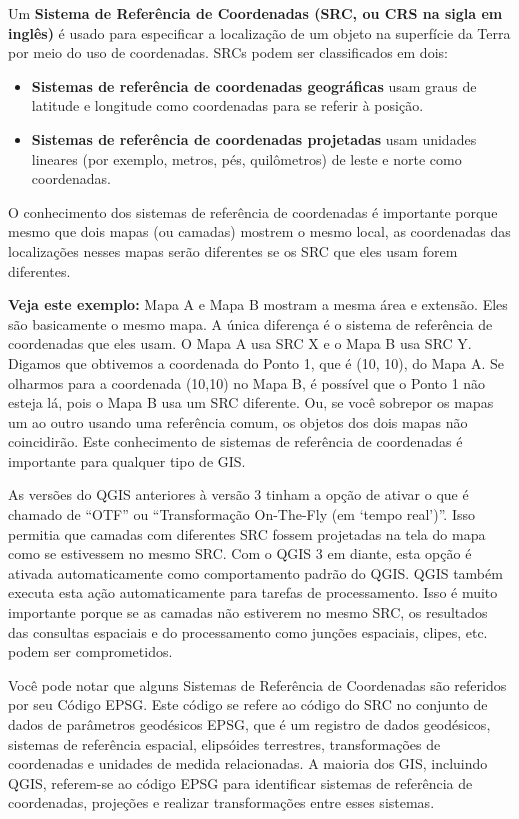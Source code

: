 \documentclass[
]{krantz}
\providecommand{\tightlist}{%
  \setlength{\itemsep}{0pt}\setlength{\parskip}{0pt}}
\begin{document}
Um \textbf{Sistema de Referência de Coordenadas (SRC, ou CRS na sigla em inglês)} é usado para especificar a localização de um objeto na superfície da Terra por meio do uso de coordenadas. SRCs podem ser classificados em dois:

\begin{itemize}
\tightlist
\item
  \textbf{Sistemas de referência de coordenadas geográficas} usam graus de latitude e longitude como coordenadas para se referir à posição.
\item
  \textbf{Sistemas de referência de coordenadas projetadas} usam unidades lineares (por exemplo, metros, pés, quilômetros) de leste e norte como coordenadas.
\end{itemize}

O conhecimento dos sistemas de referência de coordenadas é importante porque mesmo que dois mapas (ou camadas) mostrem o mesmo local, as coordenadas das localizações nesses mapas serão diferentes se os SRC que eles usam forem diferentes.

\textbf{Veja este exemplo:} Mapa A e Mapa B mostram a mesma área e extensão. Eles são basicamente o mesmo mapa. A única diferença é o sistema de referência de coordenadas que eles usam. O Mapa A usa SRC X e o Mapa B usa SRC Y. Digamos que obtivemos a coordenada do Ponto 1, que é (10, 10), do Mapa A. Se olharmos para a coordenada (10,10) no Mapa B, é possível que o Ponto 1 não esteja lá, pois o Mapa B usa um SRC diferente. Ou, se você sobrepor os mapas um ao outro usando uma referência comum, os objetos dos dois mapas não coincidirão. Este conhecimento de sistemas de referência de coordenadas é importante para qualquer tipo de GIS.

As versões do QGIS anteriores à versão 3 tinham a opção de ativar o que é chamado de ``OTF'' ou ``Transformação On-The-Fly (em `tempo real')''. Isso permitia que camadas com diferentes SRC fossem projetadas na tela do mapa como se estivessem no mesmo SRC. Com o QGIS 3 em diante, esta opção é ativada automaticamente como comportamento padrão do QGIS. QGIS também executa esta ação automaticamente para tarefas de processamento. Isso é muito importante porque se as camadas não estiverem no mesmo SRC, os resultados das consultas espaciais e do processamento como junções espaciais, clipes, etc. podem ser comprometidos.

Você pode notar que alguns Sistemas de Referência de Coordenadas são referidos por seu Código EPSG. Este código se refere ao código do SRC no conjunto de dados de parâmetros geodésicos EPSG, que é um registro de dados geodésicos, sistemas de referência espacial, elipsóides terrestres, transformações de coordenadas e unidades de medida relacionadas. A maioria dos GIS, incluindo QGIS, referem-se ao código EPSG para identificar sistemas de referência de coordenadas, projeções e realizar transformações entre esses sistemas.
\end{document}
